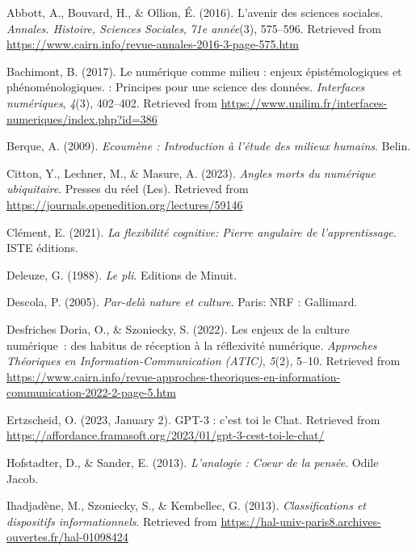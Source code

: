 \documentclass[
  a4paper,
  DIV=11,
  numbers=noendperiod]{scrreprt}
\newlength{\cslhangindent}
\newenvironment{CSLReferences}[2] %
 {\begin{list}{}{%
  \setlength{\itemindent}{0pt}
  \setlength{\leftmargin}{0pt}
  \setlength{\parsep}{0pt}
  \ifodd #1
   \setlength{\leftmargin}{\cslhangindent}
   \setlength{\itemindent}{-1\cslhangindent}
  \fi
  \setlength{\itemsep}{#2\baselineskip}}}
 {\end{list}}
\begin{document}
\label{refs-synthese}
\begin{CSLReferences}{1}{0}
Abbott, A., Bouvard, H., \& Ollion, É. (2016). L'avenir des sciences
sociales. \emph{Annales. Histoire, Sciences Sociales}, \emph{71e
année}(3), 575--596. Retrieved from
\url{https://www.cairn.info/revue-annales-2016-3-page-575.htm}

Bachimont, B. (2017). Le numérique comme milieu : enjeux
épistémologiques et phénoménologiques. : Principes pour une science des
données. \emph{Interfaces numériques}, \emph{4}(3), 402--402. Retrieved
from \url{https://www.unilim.fr/interfaces-numeriques/index.php?id=386}

Berque, A. (2009). \emph{Ecoumène : Introduction à l'étude des milieux
humains}. Belin.

Citton, Y., Lechner, M., \& Masure, A. (2023). \emph{Angles morts du
numérique ubiquitaire}. Presses du réel (Les). Retrieved from
\url{https://journals.openedition.org/lectures/59146}

Clément, E. (2021). \emph{La flexibilité cognitive: Pierre angulaire de
l'apprentissage}. ISTE éditions.

Deleuze, G. (1988). \emph{Le pli}. Editions de Minuit.

Descola, P. (2005). \emph{Par-delà nature et culture}. Paris: NRF :
Gallimard.

Desfriches Doria, O., \& Szoniecky, S. (2022). Les enjeux de la culture
numérique~: des habitus de réception à la réflexivité numérique.
\emph{Approches Théoriques en Information-Communication (ATIC)},
\emph{5}(2), 5--10. Retrieved from
\url{https://www.cairn.info/revue-approches-theoriques-en-information-communication-2022-2-page-5.htm}

Ertzscheid, O. (2023, January 2). GPT-3 : c'est toi le Chat. Retrieved
from
\url{https://affordance.framasoft.org/2023/01/gpt-3-cest-toi-le-chat/}

Hofstadter, D., \& Sander, E. (2013). \emph{L'analogie : Coeur de la
pensée}. Odile Jacob.

Ihadjadène, M., Szoniecky, S., \& Kembellec, G. (2013).
\emph{Classifications et dispositifs informationnels}. Retrieved from
\url{https://hal-univ-paris8.archives-ouvertes.fr/hal-01098424}


\end{CSLReferences}
\end{document}
